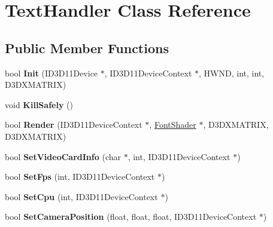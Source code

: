 \hypertarget{class_text_handler}{\section{Text\-Handler Class Reference}
\label{class_text_handler}
}
\subsection*{Public Member Functions}
\begin{DoxyCompactItemize}
\item 
\hypertarget{class_text_handler_abe94558af3cefd5cd481a5de5b40885c}{bool {\bfseries Init} (I\-D3\-D11\-Device $\ast$, I\-D3\-D11\-Device\-Context $\ast$, H\-W\-N\-D, int, int, D3\-D\-X\-M\-A\-T\-R\-I\-X)}\label{class_text_handler_abe94558af3cefd5cd481a5de5b40885c}

\item 
\hypertarget{class_text_handler_adf32952ca5c7bf14ffff81fbca9b5508}{void {\bfseries Kill\-Safely} ()}\label{class_text_handler_adf32952ca5c7bf14ffff81fbca9b5508}

\item 
\hypertarget{class_text_handler_a7a7a8b471874cb1a90efcb1b3cd0e9d4}{bool {\bfseries Render} (I\-D3\-D11\-Device\-Context $\ast$, \hyperlink{class_font_shader}{Font\-Shader} $\ast$, D3\-D\-X\-M\-A\-T\-R\-I\-X, D3\-D\-X\-M\-A\-T\-R\-I\-X)}\label{class_text_handler_a7a7a8b471874cb1a90efcb1b3cd0e9d4}

\item 
\hypertarget{class_text_handler_ac429945d4404d8539cba2662f75d1a34}{bool {\bfseries Set\-Video\-Card\-Info} (char $\ast$, int, I\-D3\-D11\-Device\-Context $\ast$)}\label{class_text_handler_ac429945d4404d8539cba2662f75d1a34}

\item 
\hypertarget{class_text_handler_aaca84b3c81a22847730229e66236b554}{bool {\bfseries Set\-Fps} (int, I\-D3\-D11\-Device\-Context $\ast$)}\label{class_text_handler_aaca84b3c81a22847730229e66236b554}

\item 
\hypertarget{class_text_handler_a843622c968a698e3f2b1703b4909e82e}{bool {\bfseries Set\-Cpu} (int, I\-D3\-D11\-Device\-Context $\ast$)}\label{class_text_handler_a843622c968a698e3f2b1703b4909e82e}

\item 
\hypertarget{class_text_handler_a30fb3d582742eb63e86e77f68a73f9a7}{bool {\bfseries Set\-Camera\-Position} (float, float, float, I\-D3\-D11\-Device\-Context $\ast$)}\label{class_text_handler_a30fb3d582742eb63e86e77f68a73f9a7}


\end{DoxyCompactItemize}
